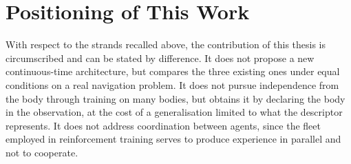 \section{Positioning of This Work}
\label{sec:rel-positioning}

With respect to the strands recalled above, the contribution of this thesis is
circumscribed and can be stated by difference. It does not propose a new
continuous-time architecture, but compares the three existing ones under equal
conditions on a real navigation problem. It does not pursue independence from
the body through training on many bodies, but obtains it by declaring the body
in the observation, at the cost of a generalisation limited to what the
descriptor represents. It does not address coordination between agents, since
the fleet employed in reinforcement training serves to produce experience in
parallel and not to cooperate.
